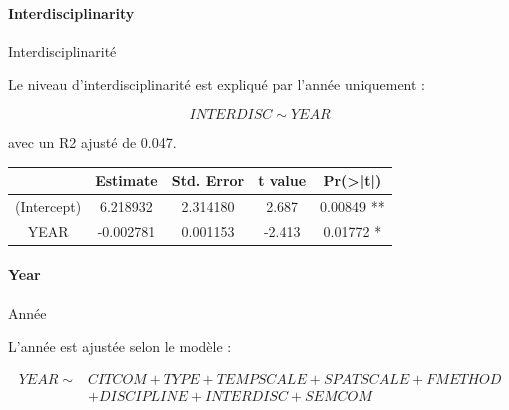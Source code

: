 




\paragraph{Interdisciplinarity}{Interdisciplinarité}


Le niveau d'interdisciplinarité est expliqué par l'année uniquement :

\[
INTERDISC \sim YEAR
\]


avec un R2 ajusté de 0.047.

{\centering
\begin{tabular}{|c|c|c|c|c|}
\hline
            & Estimate & Std. Error & t value & Pr(>|t|)   \\\hline
(Intercept) & 6.218932 &  2.314180  & 2.687 & 0.00849 ** \\
YEAR       & -0.002781 &  0.001153  & -2.413 & 0.01772 * \\\hline
\end{tabular}
}





\paragraph{Year}{Année}

L'année est ajustée selon le modèle :

\[
\begin{split}
YEAR \sim & CITCOM+TYPE+TEMPSCALE+SPATSCALE+FMETHOD \\
          & +DISCIPLINE+INTERDISC+SEMCOM
\end{split}
\]


